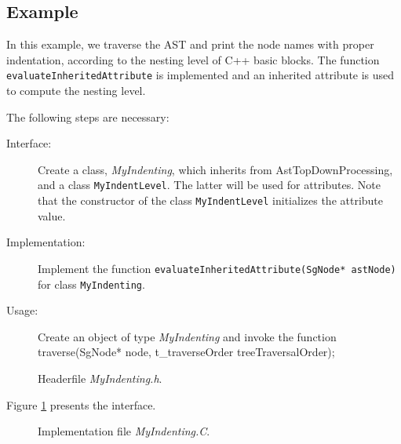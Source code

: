 \subsection{Example}
   In this example, we traverse the AST and print the node names with proper indentation,
according to the nesting level of C++ basic blocks. The function 
{\tt evaluateInheritedAttribute} is implemented and an inherited attribute is used to
compute the nesting level.

The following steps are necessary:
\begin{description}
\item[Interface:] Create a class, {\em MyIndenting}, which inherits from AstTopDownProcessing, and a class {\tt MyIndentLevel}. The latter will be used for attributes. Note that the constructor of the class {\tt MyIndentLevel} initializes the attribute value.
\item[Implementation:] Implement the function {\tt evaluateInheritedAttribute(SgNode* astNode)} for class {\tt MyIndenting}.
\item[Usage:] Create an object of type {\em MyIndenting} and invoke the function traverse(SgNode* node, t\_traverseOrder treeTraversalOrder);
\end{description}

\begin{figure}
\begin{latexonly}
   
\end{latexonly}

\begin{htmlonly}
   
\end{htmlonly}
\caption{Headerfile {\em MyIndenting.h}.}
\label{AstProcessing:myvisitor4}
\end{figure}

Figure \ref{AstProcessing:myvisitor4} presents the interface.

\begin{figure}
\begin{latexonly}
   
\end{latexonly}

\begin{htmlonly}
   
\end{htmlonly}
\caption{Implementation file {\em MyIndenting.C}.}
\label{AstProcessing:myvisitor5}
\end{figure}

